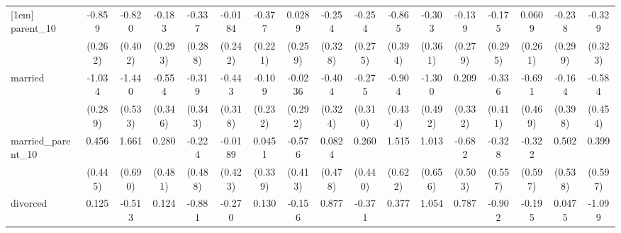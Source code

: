 {\begin{tabular}{l*{16}{c}}
[1em]
parent\_10           &      -0.859\sym{**} &      -0.820\sym{*}  &      -0.183         &      -0.337         &     -0.0184         &      -0.377         &      0.0289         &      -0.254         &      -0.254         &      -0.865\sym{*}  &      -0.303         &      -0.139         &      -0.175         &      0.0609         &      -0.238         &      -0.329         \\
                    &     (0.262)         &     (0.402)         &     (0.293)         &     (0.288)         &     (0.242)         &     (0.221)         &     (0.259)         &     (0.328)         &     (0.275)         &     (0.394)         &     (0.361)         &     (0.279)         &     (0.295)         &     (0.261)         &     (0.299)         &     (0.323)         \\
[1em]
married             &      -1.034\sym{***}&      -1.440\sym{**} &      -0.554         &      -0.319         &      -0.443         &      -0.109         &     -0.0236         &      -0.404         &      -0.275         &      -0.904\sym{*}  &      -1.300\sym{**} &       0.209         &      -0.336         &      -0.691         &      -0.164         &      -0.584         \\
                    &     (0.289)         &     (0.533)         &     (0.346)         &     (0.343)         &     (0.318)         &     (0.232)         &     (0.292)         &     (0.324)         &     (0.310)         &     (0.434)         &     (0.492)         &     (0.332)         &     (0.411)         &     (0.469)         &     (0.398)         &     (0.454)         \\
[1em]
married\_parent\_10   &       0.456         &       1.661\sym{*}  &       0.280         &      -0.224         &     -0.0189         &      0.0451         &      -0.576         &      0.0824         &       0.260         &       1.515\sym{*}  &       1.013         &      -0.682         &      -0.328         &      -0.322         &       0.502         &       0.399         \\
                    &     (0.445)         &     (0.690)         &     (0.481)         &     (0.488)         &     (0.423)         &     (0.339)         &     (0.413)         &     (0.478)         &     (0.440)         &     (0.622)         &     (0.656)         &     (0.503)         &     (0.557)         &     (0.597)         &     (0.538)         &     (0.597)         \\
[1em]
divorced            &       0.125         &      -0.513         &       0.124         &      -0.881         &      -0.270         &       0.130         &      -0.156         &       0.877\sym{*}  &      -0.371         &       0.377         &       1.054\sym{*}  &       0.787         &      -0.902         &      -0.195         &      0.0475         &      -1.099         \\

\end{tabular}}
